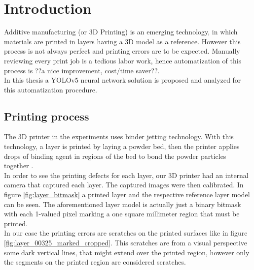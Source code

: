 \section{Introduction}
Additive manufacturing (or 3D Printing) is an emerging technology, in which
materials are printed in layers having a 3D model as a reference. However this process is not always perfect and printing errors are to be expected. Manually reviewing every print job is a tedious labor work, hence automatization of this process is ??a nice improvement, cost/time saver??. \\
In this thesis a YOLOv5 \cite{yolov5_git} neural network solution is proposed and analyzed for this automatization procedure.
\par

\subsection{Printing process}
The 3D printer in the experiments uses binder jetting technology. With this technology, a layer is printed by laying a powder bed, then the printer applies drops of binding agent in regions of the bed to bond the powder particles together \cite{binder_jetting}. \\
In order to see the printing defects for each layer, our 3D printer had an internal camera that captured each layer. The captured images were then calibrated. In figure \ref{fig:layer_bitmask} a printed layer and the respective reference layer model can be seen. The aforementioned layer model is actually just a binary bitmask with each 1-valued pixel marking a one square millimeter region that must be printed.\\
In our case the printing errors are scratches on the printed surfaces like in figure \ref{fig:layer_00325_marked_cropped}. This scratches are from a visual perspective some dark vertical lines, that might extend over the printed region, however only the segments on the printed region are considered scratches.


